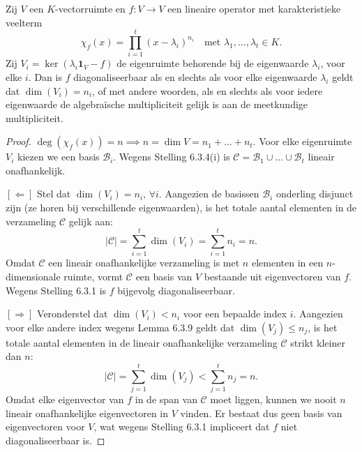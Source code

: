 \begin{stelling}[6.3.10]
    Zij $V$ een $K$-vectorruimte en $f \colon V \to V$ een lineaire operator met karakteristieke veelterm
    \[ \chi_f(x) = \prod_{i=1}^t (x - \lambda_i)^{n_i} \quad \text{met } \lambda_1, \dots, \lambda_t \in K. \]
    Zij $V_i = \operatorname{ker}(\lambda_i \mathbf{1}_V - f)$ de eigenruimte behorende bij de eigenwaarde $\lambda_i$, voor elke $i$. Dan is $f$ diagonaliseerbaar als en slechts als voor elke eigenwaarde $\lambda_i$ geldt dat $\dim(V_i) = n_i$, of met andere woorden, als en slechts als voor iedere eigenwaarde de algebraïsche multipliciteit gelijk is aan de meetkundige multipliciteit.
\end{stelling}
\begin{proof}
    $\operatorname{deg}(\chi_f(x))=n \implies n = \dim V = n_1 + \dots + n_t$.
    Voor elke eigenruimte $V_i$ kiezen we een basis $\mathcal{B}_i$.
    Wegens Stelling 6.3.4(i) is $\mathcal{C} = \mathcal{B}_1 \cup \dots \cup \mathcal{B}_t$ lineair onafhankelijk.

    \([\Leftarrow]\)
    Stel dat $\dim(V_i) = n_i, \, \forall i$.
     Aangezien de basissen $\mathcal{B}_i$ onderling disjunct zijn (ze horen bij verschillende eigenwaarden),
     is het totale aantal elementen in de verzameling $\mathcal{C}$ gelijk aan:
    \[ |\mathcal{C}| = \sum_{i=1}^t \dim(V_i) = \sum_{i=1}^t n_i = n . \]
    Omdat $\mathcal{C}$ een lineair onafhankelijke verzameling is met $n$ elementen in een $n$-dimensionale ruimte,
    vormt $\mathcal{C}$ een basis van $V$ bestaande uit eigenvectoren van $f$.
    Wegens Stelling 6.3.1 is $f$ bijgevolg diagonaliseerbaar.

    \([\Rightarrow]\)
    Veronderstel dat $\dim(V_i) < n_i$ voor een bepaalde index $i$.
     Aangezien voor elke andere index wegens Lemma 6.3.9 geldt dat $\dim(V_j) \le n_j$,
    is het totale aantal elementen in de lineair onafhankelijke verzameling $\mathcal{C}$ strikt kleiner dan $n$:
    \[ |\mathcal{C}| = \sum_{j=1}^t \dim(V_j) < \sum_{j=1}^t n_j = n. \]
    Omdat elke eigenvector van $f$ in de span van $\mathcal{C}$ moet liggen,
    kunnen we nooit $n$ lineair onafhankelijke eigenvectoren in $V$ vinden.
    Er bestaat dus geen basis van eigenvectoren voor $V$, wat wegens Stelling 6.3.1 impliceert dat $f$ niet diagonaliseerbaar is.
\end{proof}
